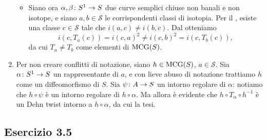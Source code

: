 \begin{enumerate}[(1)]
\begin{itemize}
\item Siano ora $\map{\alpha,\beta}{S^1}{S}$ due curve semplici chiuse non banali e non isotope, e siano $a,b\in\mathcal{S}$ le corrispondenti classi di isotopia. Per il , esiste una classe $c\in\mathcal{S}$ tale che $i(a,c)\neq i(b,c)$. Dal  otteniamo
\[
i(c,T_a(c))=i(c,a)^2\neq i(c,b)^2=i(c,T_b(c)),
\]
da cui $T_a\neq T_b$ come elementi di $\operatorname{MCG}(S)$.
\end{itemize}
\item Per non creare conflitti di notazione, siano $h\in\operatorname{MCG}(S)$, $a\in\mathcal{S}$. Sia $\map{\alpha}{S^1}{S}$ un rappresentante di $a$, e con lieve abuso di notazione trattiamo $h$ come un diffeomorfismo di $S$. Sia $\map{\psi}{A}{S}$ un intorno regolare di $\alpha$: notiamo che $h\circ\psi$ è un intorno regolare di $h\circ\alpha$. Ma allora è evidente che $h\circ T_\alpha\circ h^{-1}$ è un Dehn twist intorno a $h\circ\alpha$, da cui la tesi.
\end{enumerate}

\subsection*{Esercizio 3.5}
\newcommand{\ngon}[3][0]{
\tikzmath{
\g = #2;
\r = #3;
\n = \g * 4;
\twog = \g * 2;
}
\foreach \i [evaluate=\i as \an using 180*((2*\i-1)/\n+1)] in {1,...,\n} {
    \tkzDefPoint(\an:\r){x_\i}
    \tikzmath{\an1 = \an + #1;}
    \tkzLabelPoint[label=\an1:$x_{\i}$,anchor=base](x_\i){}
}
\begin{scope}[on background layer]
\tkzFillPolygon[blue!10](x_1,x_...,x_\n)
\end{scope}
\foreach \i in {1,...,\twog} {
    \tikzmath{
        \j = \i + 1;
        \l = \twog + \i;
        \k = \l + 1;
        if \k > \n then {
            \k = 1;
        };
        if Mod(\i, 2) == 0 then {
            let \col = white;
        } else {
            let \col = black;
        };
        \s = .15 * 3 / (\r * 5.1 * sin(180 / \n));
        \t = (\i + Mod(\i, 2) - 2) / 2;
    }
    \foreach \b/\e in {\i/\j,\k/\l} {
        \tkzDrawSegment[postaction={decorate},decoration={markings,mark=between positions (0.5+\s*0.75-\s/2*\t) and (0.51+\s*0.75+\s/2*\t) step \s with {\arrow[scale=1.2,\col]{Triangle}\arrow[scale=1.2,black]{Triangle[open]}}}](x_\b,x_\e)
    }
}
\tkzDrawPoints(x_1,x_...,x_\n)
}


